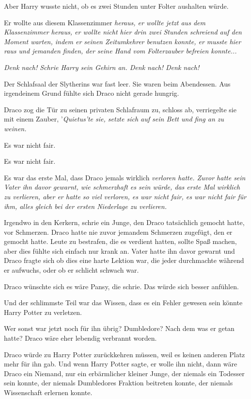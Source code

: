 {Aber Harry wusste nicht, ob es zwei Stunden unter Folter aushalten würde.

Er wollte aus diesem Klassenzimmer \emph{heraus, er wollte \emph{jetzt} aus dem Klassenzimmer heraus, er wollte nicht hier drin zwei Stunden schreiend auf den Moment warten, indem er seinen Zeitumkehrer benutzen konnte, er musste \emph{hier raus} und jemanden finden, der seine Hand vom Folterzauber befreien konnte...}

\emph{Denk nach! Schrie Harry sein Gehirn an. Denk nach! Denk nach!}

\hfill\break Der Schlafsaal der Slytherins war fast leer. Sie waren beim Abendessen. Aus irgendeinem Grund fühlte sich Draco nicht gerade hungrig.

Draco zog die Tür zu seinen privaten Schlafraum zu, schloss ab, verriegelte sie mit einem Zauber, '\emph{Quietus'te sie, setzte sich auf sein Bett und fing an zu weinen.}

Es war nicht fair.

Es war nicht fair.

Es war das erste Mal, dass Draco jemals wirklich \emph{verloren hatte. Zuvor hatte sein Vater ihn davor gewarnt, wie schmerzhaft es sein würde, das erste Mal wirklich zu verlieren, aber er hatte \emph{so viel} verloren, es war nicht fair, es war nicht fair für ihm, \emph{alles} gleich bei der ersten Niederlage zu verlieren.}

Irgendwo in den Kerkern, schrie ein Junge, den Draco tatsächlich gemocht hatte, vor Schmerzen. Draco hatte nie zuvor jemandem Schmerzen zugefügt, den er gemocht hatte. Leute zu bestrafen, die es verdient hatten, sollte Spaß machen, aber dies fühlte sich einfach nur krank an. Vater hatte ihn davor gewarnt und Draco fragte sich ob dies eine harte Lektion war, die jeder durchmachte während er aufwuchs, oder ob er schlicht schwach war.

Draco wünschte sich es wäre Pansy, die schrie. Das würde sich besser anfühlen.

Und der schlimmste Teil war das Wissen, dass es ein Fehler gewesen sein könnte Harry Potter zu verletzen.

Wer sonst war jetzt noch für ihn übrig? Dumbledore? Nach dem was er getan hatte? Draco wäre eher lebendig verbrannt worden.

Draco würde zu Harry Potter zurückkehren müssen, weil es keinen anderen Platz mehr für ihn gab. Und wenn Harry Potter sagte, er wolle ihn nicht, dann wäre Draco ein Niemand, nur ein erbärmlicher kleiner Junge, der niemals ein Todesser sein konnte, der niemals Dumbledores Fraktion beitreten konnte, der niemals Wissenschaft erlernen konnte.

}
